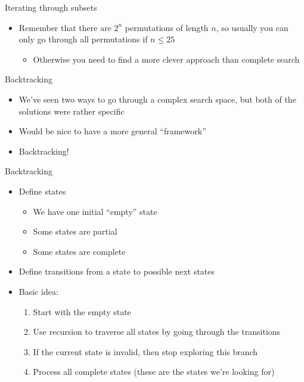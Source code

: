 \documentclass[12pt,t]{beamer}
\newcommand{\bi}{\begin{itemize}}
\newcommand{\ei}{\end{itemize}}
\begin{document}
\begin{frame}{Iterating through subsets}
    \vspace{40pt}

    \bi
        \vspace{20pt}
        \item Remember that there are $2^n$ permutations of length $n$, so usually you can only go through all permutations if $n \leq 25$
            \bi
                \item Otherwise you need to find a more clever approach than complete search
            \ei
            \vspace{20pt}
    \ei
\end{frame}


\begin{frame}[fragile]{Backtracking}
    \vspace{30pt}

    \bi
        \item We've seen two ways to go through a complex search space, but both of the solutions were rather specific
        \item Would be nice to have a more general ``framework''
        \vspace{10pt}
        \item Backtracking!
    \ei
\end{frame}

\begin{frame}[fragile]{Backtracking}
    \vspace{20pt}
    \bi
        \item Define states
            \bi
                \item We have one initial ``empty'' state
                \item Some states are partial
                \item Some states are complete
            \ei
        \vspace{10pt}
        \item Define transitions from a state to possible next states
        \vspace{10pt}
        \item Basic idea:
            \begin{enumerate}
                \item Start with the empty state
                \item Use recursion to traverse all states by going through the transitions
                \item If the current state is invalid, then stop exploring this branch
                \item Process all complete states (these are the states we're looking for)
            \end{enumerate}
    \ei
\end{frame}
\end{document}
